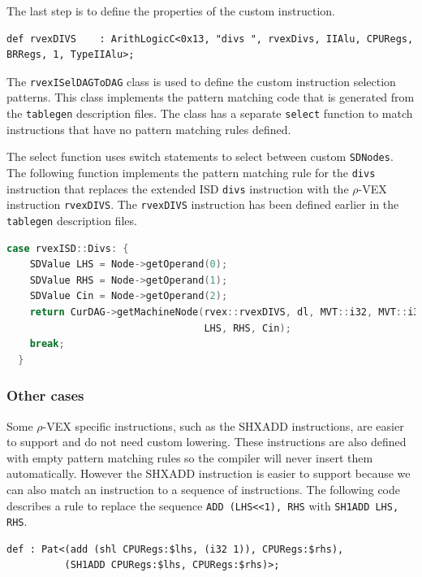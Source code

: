 The last step is to define the properties of the custom instruction.

\begin{lstlisting}[language=tblgen]
def rvexDIVS    : ArithLogicC<0x13, "divs ", rvexDivs, IIAlu, CPURegs, BRRegs, 1, TypeIIAlu>;
\end{lstlisting}

The \texttt{rvexISelDAGToDAG} class is used to define the custom instruction selection patterns. This class implements the pattern matching code that is generated from the \texttt{tablegen} description files. The class has a separate \texttt{select} function to match instructions that have no pattern matching rules defined.

The select function uses switch statements to select between custom \texttt{SDNodes}. The following function implements the pattern matching rule for the \texttt{divs} instruction that replaces the extended ISD \texttt{divs} instruction with the $\rho$-VEX instruction \texttt{rvexDIVS}. The \texttt{rvexDIVS} instruction has been defined earlier in the \texttt{tablegen} description files.

\begin{lstlisting}[language=C++]   
  case rvexISD::Divs: {
    SDValue LHS = Node->getOperand(0);
    SDValue RHS = Node->getOperand(1);
    SDValue Cin = Node->getOperand(2);
    return CurDAG->getMachineNode(rvex::rvexDIVS, dl, MVT::i32, MVT::i32,
                                  LHS, RHS, Cin);
    break;
  }
\end{lstlisting}

\subsubsection{Other cases}
Some $\rho$-VEX specific instructions, such as the SHXADD instructions, are easier to support and do not need custom lowering. These instructions are also defined with empty pattern matching rules so the compiler will never insert them automatically. However the SHXADD instruction is easier to support because we can also match an instruction to a sequence of instructions. The following code describes a rule to replace the sequence \texttt{ADD (LHS\textless\textless1), RHS} with \texttt{SH1ADD LHS, RHS}.

\begin{lstlisting}[language=tblgen]
def : Pat<(add (shl CPURegs:$lhs, (i32 1)), CPURegs:$rhs),
          (SH1ADD CPURegs:$lhs, CPURegs:$rhs)>;
\end{lstlisting}

